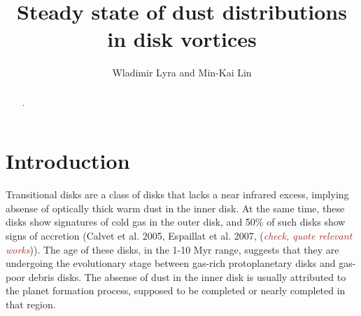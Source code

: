 \documentclass[apj]{emulateapj}
\def\brown#1{\textcolor{brown}{#1}}
\newcommand{\comm}[1]{({\it \brown{#1}})}
\begin{document}

\title{Steady state of dust distributions in disk vortices}
\author{Wladimir Lyra and Min-Kai Lin}

\begin{abstract}
.
\end{abstract}

\section{Introduction}
\label{sect:introduction}



Transitional disks are a class of disks that lacks a near infrared
excess, implying absense of optically thick warm dust in the inner
disk. At the same time, these disks show signatures of cold gas in the
outer disk, and 50\% of such disks show signs of accretion (Calvet et
al. 2005, Espaillat et al. 2007, \comm{check, quote relevant works}). 
The age of these disks, in the 1-10 Myr range, suggests that they are undergoing 
the evolutionary stage between gas-rich protoplanetary disks and gas-poor
debris disks. The absense of dust in the inner disk is usually
attributed to the planet formation process, supposed to be completed
or nearly completed in that region. 


\end{document}
